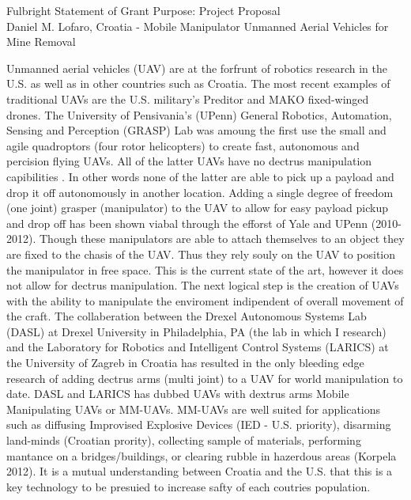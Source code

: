 \documentclass[12pt]{article}
\begin{document}
\begin{center}
Fulbright Statement of Grant Purpose: Project Proposal\\
Daniel M. Lofaro, Croatia - 
Mobile Manipulator Unmanned Aerial Vehicles for Mine Removal\\

\end{center}

Unmanned aerial vehicles (UAV) are at the forfrunt of robotics research in the U.S. as well as in other countries such as Croatia.  
The most recent examples of traditional UAVs are the U.S. military's Preditor and MAKO fixed-winged drones.  
The University of Pensivania's (UPenn) General Robotics, Automation, Sensing and Perception (GRASP) Lab was amoung the first use the small and agile quadroptors (four rotor helicopters) to create fast, autonomous and percision flying UAVs.  
All of the latter UAVs have no dectrus manipulation capibilities .
In other words none of the latter are able to pick up a payload and drop it off autonomously in another location.
Adding a single degree of freedom (one joint) grasper (manipulator) to the UAV to allow for easy payload pickup and drop off has been shown viabal through the efforst of Yale and UPenn (2010-2012). 
Though these manipulators are able to attach themselves to an object they are fixed to the chasis of the UAV.
Thus they rely souly on the UAV to position the manipulator in free space.  
This is the current state of the art, however it does not allow for dectrus manipulation.  
The next logical step is the creation of UAVs with the ability to manipulate the enviroment indipendent of overall movement of the craft.  
The collaberation between the Drexel Autonomous Systems Lab (DASL) at Drexel University in Philadelphia, PA (the lab in which I research) and the Laboratory for Robotics and Intelligent Control Systems (LARICS) at the University of Zagreb in Croatia has resulted in the only bleeding edge research of adding dectrus arms (multi joint) to a UAV for world manipulation to date.  DASL and LARICS has dubbed UAVs with dextrus arms Mobile Manipulating UAVs or MM-UAVs. 
MM-UAVs are well suited for applications such as diffusing Improvised Explosive Devices (IED - U.S. priority), disarming land-minds (Croatian prority), collecting sample of materials, performing mantance on a bridges/buildings, or clearing rubble in hazerdous areas (Korpela 2012).  
It is a mutual understanding between Croatia and the U.S. that this is a key technology to be presuied to increase safty of each coutries population.
\end{document}
